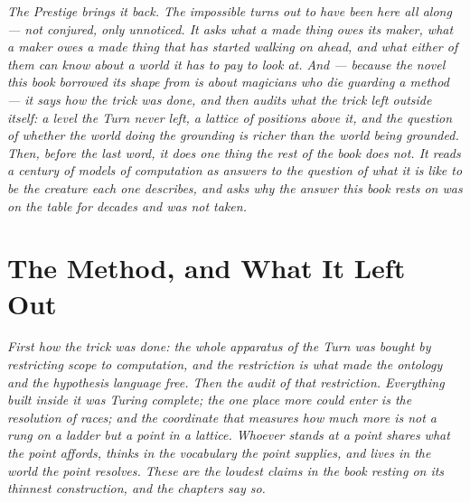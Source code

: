 \documentclass[12pt,openright,twoside]{book}
\theoremstyle{remark}
\theoremstyle{plain}
\theoremstyle{remark}
\theoremstyle{plain}
\theoremstyle{plain}
\begin{document}
\vspace{1em}
\begin{mdframed}[backgroundcolor=remarkgray, linecolor=gray!60,
                 linewidth=1pt, topline=false, rightline=false,
                 bottomline=false]
\small\itshape
\setlength{\emergencystretch}{2em}%
The Prestige brings it back.
The impossible turns out to have been here all along --- not conjured,
only unnoticed.
It asks what a made thing owes its maker, what a maker owes a made
thing that has started walking on ahead, and what either of them can
know about a world it has to pay to look at.
And --- because the novel this book borrowed its shape from is about
magicians who die guarding a method --- it says how the trick was
done, and then audits what the trick left outside itself: a level the
Turn never left, a lattice of positions above it, and the question of
whether the world doing the grounding is richer than the world being
grounded.
Then, before the last word, it does one thing the rest of the book
does not.
It reads a century of models of computation as answers to the question
of what it is like to be the creature each one describes, and asks why
the answer this book rests on was on the table for decades and was
not taken.
\end{mdframed}

\bigskip



\part{The Method, and What It Left Out}
\label{part:method}

\vspace{1em}
\begin{mdframed}[backgroundcolor=remarkgray, linecolor=gray!60,
                 linewidth=1pt, topline=false, rightline=false,
                 bottomline=false]
\small\itshape
First how the trick was done: the whole apparatus of the Turn was bought
by restricting scope to computation, and the restriction is what made the
ontology and the hypothesis language free.
Then the audit of that restriction.
Everything built inside it was Turing complete; the one place more could
enter is the resolution of races; and the coordinate that measures how
much more is not a rung on a ladder but a point in a lattice.
Whoever stands at a point shares what the point affords, thinks in the
vocabulary the point supplies, and lives in the world the point resolves.
These are the loudest claims in the book resting on its thinnest
construction, and the chapters say so.
\end{mdframed}
\end{document}
